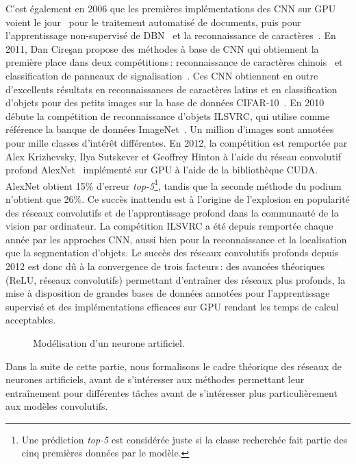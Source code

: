 C'est également en 2006 que les premières implémentations des \gls{CNN} sur \gls{GPU} voient le jour~\cite{chellapilla_high_2006} pour le traitement automatisé de documents, puis pour l'apprentissage non-supervisé de \gls{DBN}~\cite{raina_large-scale_2009} et la reconnaissance de caractères~\cite{ciresan_deep_2010}. En 2011, Dan Cire\c{s}an propose des méthodes à base de \gls{CNN} qui obtiennent la première place dans deux compétitions\,: reconnaissance de caractères chinois~\cite{liu_icdar_2011} et classification de panneaux de signalisation~\cite{stallkamp_german_2011}. Ces \gls{CNN} obtiennent en outre d'excellents résultats en reconnaissances de caractères latins et en classification d'objets pour des petits images sur la base de données CIFAR-10~\cite{ciresan_multi-column_2012}. En 2010 débute la compétition de reconnaissance d'objets \gls{ILSVRC}, qui utilise comme référence la banque de données ImageNet~\cite{deng_imagenet_2009}. Un million d'images sont annotées pour mille classes d'intérêt différentes. En 2012, la compétition est remportée par Alex Krizhevsky, Ilya Sutskever et Geoffrey Hinton à l'aide du réseau convolutif profond AlexNet~\cite{krizhevsky_imagenet_2012} implémenté sur \gls{GPU} à l'aide de la bibliothèque \gls{CUDA}. AlexNet obtient 15\% d'erreur \emph{top-5}\footnote{Une prédiction \emph{top-5} est considérée juste si la classe recherchée fait partie des cinq premières données par le modèle.}, tandis que la seconde méthode du podium n'obtient que 26\%. Ce succès inattendu est à l'origine de l'explosion en popularité des réseaux convolutifs et de l'apprentissage profond dans la communauté de la vision par ordinateur. La compétition \gls{ILSVRC} a été depuis remportée chaque année par les approches \gls{CNN}, aussi bien pour la reconnaissance et la localisation que la segmentation d'objets. Le succès des réseaux convolutifs profonds depuis 2012 est donc dû à la convergence de trois facteurs\,: des avancées théoriques (\gls{ReLU}, réseaux convolutifs) permettant d'entraîner des réseaux plus profonds, la mise à disposition de grandes bases de données annotées pour l'apprentissage supervisé et des implémentations efficaces sur \gls{GPU} rendant les temps de calcul acceptables.

\begin{figure}[t]
  \resizebox{\textwidth}{!}{
  
  }
\caption{Modélisation d'un neurone artificiel.}
\label{fig:neurone}
\end{figure}

Dans la suite de cette partie, nous formalisons le cadre théorique des réseaux de neurones artificiels, avant de s'intéresser aux méthodes permettant leur entraînement pour différentes tâches avant de s'intéresser plus particulièrement aux modèles convolutifs.

